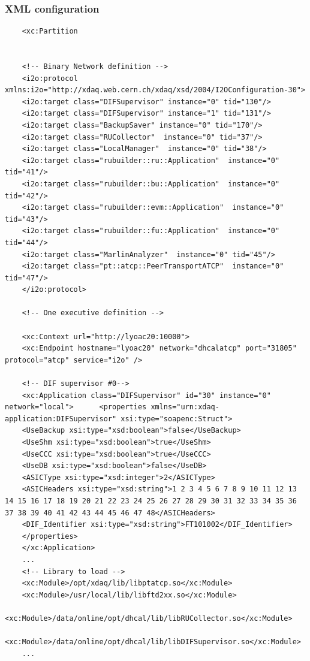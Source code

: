 \begin{frame}[fragile,shrink=60]
  \frametitle{XML configuration}

\begin{verbatim}
    <xc:Partition 
    

    <!-- Binary Network definition -->
    <i2o:protocol xmlns:i2o="http://xdaq.web.cern.ch/xdaq/xsd/2004/I2OConfiguration-30">
    <i2o:target class="DIFSupervisor" instance="0" tid="130"/>
    <i2o:target class="DIFSupervisor" instance="1" tid="131"/>
    <i2o:target class="BackupSaver" instance="0" tid="170"/>
    <i2o:target class="RUCollector"  instance="0" tid="37"/>
    <i2o:target class="LocalManager"  instance="0" tid="38"/>
    <i2o:target class="rubuilder::ru::Application"  instance="0" tid="41"/>
    <i2o:target class="rubuilder::bu::Application"  instance="0" tid="42"/>
    <i2o:target class="rubuilder::evm::Application"  instance="0" tid="43"/>
    <i2o:target class="rubuilder::fu::Application"  instance="0" tid="44"/>
    <i2o:target class="MarlinAnalyzer"  instance="0" tid="45"/>
    <i2o:target class="pt::atcp::PeerTransportATCP"  instance="0" tid="47"/>
    </i2o:protocol>

    <!-- One executive definition -->

    <xc:Context url="http://lyoac20:10000">
    <xc:Endpoint hostname="lyoac20" network="dhcalatcp" port="31805" protocol="atcp" service="i2o" />

    <!-- DIF supervisor #0-->
    <xc:Application class="DIFSupervisor" id="30" instance="0"  network="local">      <properties xmlns="urn:xdaq-application:DIFSupervisor" xsi:type="soapenc:Struct">
    <UseBackup xsi:type="xsd:boolean">false</UseBackup>
    <UseShm xsi:type="xsd:boolean">true</UseShm>	
    <UseCCC xsi:type="xsd:boolean">true</UseCCC>
    <UseDB xsi:type="xsd:boolean">false</UseDB>	
    <ASICType xsi:type="xsd:integer">2</ASICType>
    <ASICHeaders xsi:type="xsd:string">1 2 3 4 5 6 7 8 9 10 11 12 13 14 15 16 17 18 19 20 21 22 23 24 25 26 27 28 29 30 31 32 33 34 35 36 37 38 39 40 41 42 43 44 45 46 47 48</ASICHeaders>
    <DIF_Identifier xsi:type="xsd:string">FT101002</DIF_Identifier>
    </properties>
    </xc:Application>
    ...
    <!-- Library to load -->
    <xc:Module>/opt/xdaq/lib/libptatcp.so</xc:Module>
    <xc:Module>/usr/local/lib/libftd2xx.so</xc:Module>
    <xc:Module>/data/online/opt/dhcal/lib/libRUCollector.so</xc:Module>
    <xc:Module>/data/online/opt/dhcal/lib/libDIFSupervisor.so</xc:Module>
    ...
\end{verbatim}

\end{frame}

